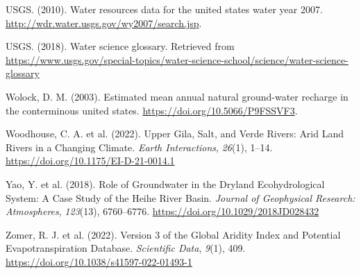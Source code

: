 \documentclass[
]{agujournal2019}
\newlength{\cslhangindent}
\newenvironment{CSLReferences}[2] %
 {\begin{list}{}{%
  \setlength{\itemindent}{0pt}
  \setlength{\leftmargin}{0pt}
  \setlength{\parsep}{0pt}
  \ifodd #1
   \setlength{\leftmargin}{\cslhangindent}
   \setlength{\itemindent}{-1\cslhangindent}
  \fi
  \setlength{\itemsep}{#2\baselineskip}}}
 {\end{list}}
\begin{document}
\begin{CSLReferences}{1}{0}
USGS. (2010). Water resources data for the united states water year
2007. \url{http://wdr.water.usgs.gov/wy2007/search.jsp}.

USGS. (2018). Water science glossary. Retrieved from
\url{https://www.usgs.gov/special-topics/water-science-school/science/water-science-glossary}

Wolock, D. M. (2003). Estimated mean annual natural ground-water
recharge in the conterminous united states.
\url{https://doi.org/10.5066/P9FSSVF3}.

Woodhouse, C. A. et al. (2022). Upper {Gila}, {Salt}, and {Verde
Rivers}: {Arid Land Rivers} in a {Changing Climate}. \emph{Earth
Interactions}, \emph{26}(1), 1--14.
\url{https://doi.org/10.1175/EI-D-21-0014.1}

Yao, Y. et al. (2018). Role of Groundwater in the Dryland
Ecohydrological System: A Case Study of the Heihe River Basin.
\emph{Journal of Geophysical Research: Atmospheres}, \emph{123}(13),
6760--6776. \url{https://doi.org/10.1029/2018JD028432}

Zomer, R. J. et al. (2022). Version 3 of the Global Aridity Index and
Potential Evapotranspiration Database. \emph{Scientific Data},
\emph{9}(1), 409. \url{https://doi.org/10.1038/s41597-022-01493-1}

\end{CSLReferences}
\end{document}
